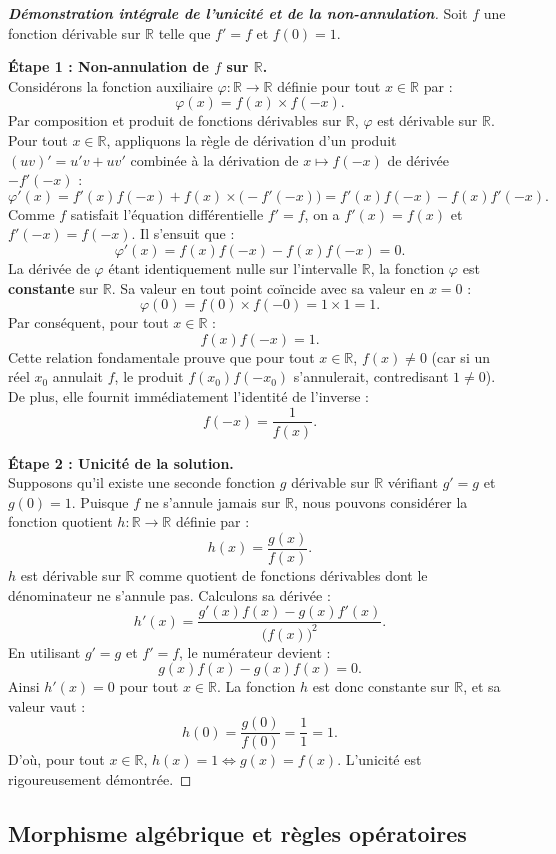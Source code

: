 \documentclass[11pt,a4paper]{article}
\newcommand{\R}{\mathbb{R}}
\begin{document}
\begin{proof}[\textbf{Démonstration intégrale de l'unicité et de la non-annulation}]
Soit $f$ une fonction dérivable sur $\R$ telle que $f' = f$ et $f(0) = 1$.

\textbf{Étape 1 : Non-annulation de $f$ sur $\R$.}\\
Considérons la fonction auxiliaire $\varphi : \R \to \R$ définie pour tout $x \in \R$ par :
\[
\varphi(x) = f(x) \times f(-x).
\]
Par composition et produit de fonctions dérivables sur $\R$, $\varphi$ est dérivable sur $\R$. Pour tout $x \in \R$, appliquons la règle de dérivation d'un produit $(uv)' = u'v + uv'$ combinée à la dérivation de $x \mapsto f(-x)$ de dérivée $-f'(-x)$ :
\[
\varphi'(x) = f'(x) f(-x) + f(x) \times \bigl(-f'(-x)\bigr) = f'(x) f(-x) - f(x) f'(-x).
\]
Comme $f$ satisfait l'équation différentielle $f' = f$, on a $f'(x) = f(x)$ et $f'(-x) = f(-x)$. Il s'ensuit que :
\[
\varphi'(x) = f(x) f(-x) - f(x) f(-x) = 0.
\]
La dérivée de $\varphi$ étant identiquement nulle sur l'intervalle $\R$, la fonction $\varphi$ est \textbf{constante} sur $\R$. Sa valeur en tout point coïncide avec sa valeur en $x = 0$ :
\[
\varphi(0) = f(0) \times f(-0) = 1 \times 1 = 1.
\]
Par conséquent, pour tout $x \in \R$ :
\[
f(x) f(-x) = 1.
\]
Cette relation fondamentale prouve que pour tout $x \in \R$, $f(x) \neq 0$ (car si un réel $x_0$ annulait $f$, le produit $f(x_0)f(-x_0)$ s'annulerait, contredisant $1 \neq 0$). De plus, elle fournit immédiatement l'identité de l'inverse :
\[
f(-x) = \frac{1}{f(x)}.
\]

\textbf{Étape 2 : Unicité de la solution.}\\
Supposons qu'il existe une seconde fonction $g$ dérivable sur $\R$ vérifiant $g' = g$ et $g(0) = 1$. Puisque $f$ ne s'annule jamais sur $\R$, nous pouvons considérer la fonction quotient $h : \R \to \R$ définie par :
\[
h(x) = \frac{g(x)}{f(x)}.
\]
$h$ est dérivable sur $\R$ comme quotient de fonctions dérivables dont le dénominateur ne s'annule pas. Calculons sa dérivée :
\[
h'(x) = \frac{g'(x) f(x) - g(x) f'(x)}{\bigl(f(x)\bigr)^2}.
\]
En utilisant $g' = g$ et $f' = f$, le numérateur devient :
\[
g(x) f(x) - g(x) f(x) = 0.
\]
Ainsi $h'(x) = 0$ pour tout $x \in \R$. La fonction $h$ est donc constante sur $\R$, et sa valeur vaut :
\[
h(0) = \frac{g(0)}{f(0)} = \frac{1}{1} = 1.
\]
D'où, pour tout $x \in \R$, $h(x) = 1 \iff g(x) = f(x)$. L'unicité est rigoureusement démontrée.
\end{proof}

\subsection{Morphisme algébrique et règles opératoires}
\end{document}
